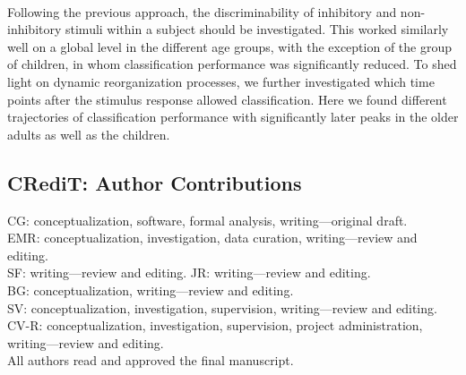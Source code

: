 \\
Following the previous approach, the discriminability of inhibitory and non-inhibitory stimuli within a subject should be investigated. This worked similarly well on a global level in the different age groups, with the exception of the group of children, in whom classification performance was significantly reduced.
To shed light on dynamic reorganization processes, we further investigated which time points after the stimulus response allowed classification. Here we found different trajectories of classification performance with significantly later peaks in the older adults as well as the children. 

% 

\subsection*{CRediT: Author Contributions}
CG: conceptualization, software, formal analysis, writing—original draft.\\
EMR: conceptualization, investigation, data curation, writing—review and editing.\\
SF: writing—review and editing. JR: writing—review and editing.\\ 
BG: conceptualization, writing—review and editing.\\ 
SV: conceptualization, investigation, supervision, writing—review and editing.\\ 
CV-R: conceptualization, investigation, supervision, project administration, writing—review and editing.\\ 
All authors read and approved the final manuscript.\\

